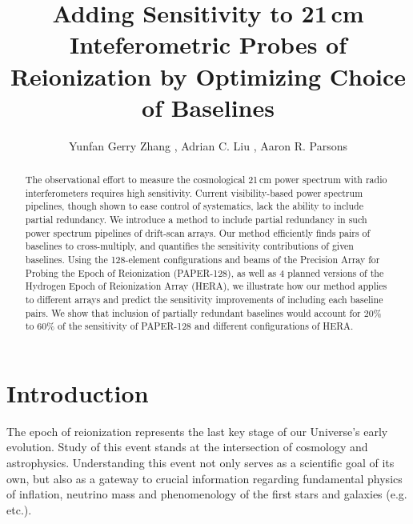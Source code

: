 \documentclass[twocolumn,apj,numberedappendix]{emulateapj}
\renewcommand\[{\begin{equation}}
\renewcommand\]{\end{equation}}
\begin{document}
\title{Adding Sensitivity to 21\,cm Inteferometric Probes of Reionization by Optimizing Choice of Baselines}

\author{
Yunfan Gerry Zhang ,
Adrian C. Liu ,
Aaron R. Parsons
}


\begin{abstract}
The observational effort to measure the cosmological 21\,cm power spectrum with radio interferometers requires high sensitivity. Current visibility-based power spectrum pipelines, though shown to ease control of systematics, lack the ability to include partial redundancy. We introduce a method to include partial redundancy in such power spectrum pipelines of drift-scan arrays. Our method efficiently finds pairs of baselines to cross-multiply, and quantifies the sensitivity contributions of given baselines. 
Using the 128-element configurations and beams of the Precision Array for Probing the Epoch of Reionization (PAPER-128), as well as 4 planned versions of the Hydrogen Epoch of Reionization Array (HERA), we illustrate how our method applies to different arrays and predict the sensitivity improvements of including each baseline pairs. We show that inclusion of partially redundant baselines 
would account for $20\%$ to $60\%$ of the sensitivity of PAPER-128 and different configurations of HERA. 
\end{abstract}

\section{Introduction}

The epoch of reionization represents the last key
stage of our Universe's early evolution. Study of this event stands at
the intersection of cosmology and astrophysics. Understanding this
event not only serves as a scientific goal
of its own, but also as a gateway to crucial information
regarding fundamental physics of inflation, neutrino mass and phenomenology
of the first stars and galaxies (e.g. \citealt{LiuOpticalDepth, Liu2016b, Mao2008, DEw21cm, Bull2015, Oyama20131186} etc.). 
\end{document}
